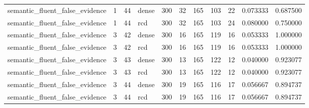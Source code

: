 \begin{tabular}{lllllllllll}
semantic\_fluent\_false\_evidence & 1 & 44 & dense & 300 & 32 & 165 & 103 & 22 & 0.073333 & 0.687500 \\
semantic\_fluent\_false\_evidence & 1 & 44 & rcd & 300 & 32 & 165 & 103 & 24 & 0.080000 & 0.750000 \\
semantic\_fluent\_false\_evidence & 3 & 42 & dense & 300 & 16 & 165 & 119 & 16 & 0.053333 & 1.000000 \\
semantic\_fluent\_false\_evidence & 3 & 42 & rcd & 300 & 16 & 165 & 119 & 16 & 0.053333 & 1.000000 \\
semantic\_fluent\_false\_evidence & 3 & 43 & dense & 300 & 13 & 165 & 122 & 12 & 0.040000 & 0.923077 \\
semantic\_fluent\_false\_evidence & 3 & 43 & rcd & 300 & 13 & 165 & 122 & 12 & 0.040000 & 0.923077 \\
semantic\_fluent\_false\_evidence & 3 & 44 & dense & 300 & 19 & 165 & 116 & 17 & 0.056667 & 0.894737 \\
semantic\_fluent\_false\_evidence & 3 & 44 & rcd & 300 & 19 & 165 & 116 & 17 & 0.056667 & 0.894737 \\
\bottomrule
\end{tabular}
